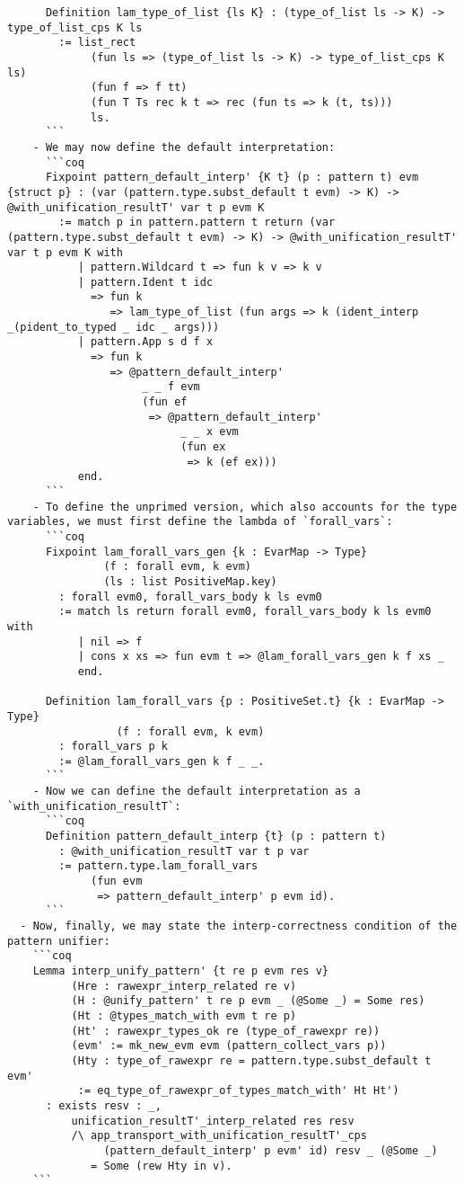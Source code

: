 \begin{itemize}
\begin{verbatim}
      Definition lam_type_of_list {ls K} : (type_of_list ls -> K) -> type_of_list_cps K ls
        := list_rect
             (fun ls => (type_of_list ls -> K) -> type_of_list_cps K ls)
             (fun f => f tt)
             (fun T Ts rec k t => rec (fun ts => k (t, ts)))
             ls.
      ```
    - We may now define the default interpretation:
      ```coq
      Fixpoint pattern_default_interp' {K t} (p : pattern t) evm {struct p} : (var (pattern.type.subst_default t evm) -> K) -> @with_unification_resultT' var t p evm K
        := match p in pattern.pattern t return (var (pattern.type.subst_default t evm) -> K) -> @with_unification_resultT' var t p evm K with
           | pattern.Wildcard t => fun k v => k v
           | pattern.Ident t idc
             => fun k
                => lam_type_of_list (fun args => k (ident_interp _(pident_to_typed _ idc _ args)))
           | pattern.App s d f x
             => fun k
                => @pattern_default_interp'
                     _ _ f evm
                     (fun ef
                      => @pattern_default_interp'
                           _ _ x evm
                           (fun ex
                            => k (ef ex)))
           end.
      ```
    - To define the unprimed version, which also accounts for the type variables, we must first define the lambda of `forall_vars`:
      ```coq
      Fixpoint lam_forall_vars_gen {k : EvarMap -> Type}
               (f : forall evm, k evm)
               (ls : list PositiveMap.key)
        : forall evm0, forall_vars_body k ls evm0
        := match ls return forall evm0, forall_vars_body k ls evm0 with
           | nil => f
           | cons x xs => fun evm t => @lam_forall_vars_gen k f xs _
           end.

      Definition lam_forall_vars {p : PositiveSet.t} {k : EvarMap -> Type}
                 (f : forall evm, k evm)
        : forall_vars p k
        := @lam_forall_vars_gen k f _ _.
      ```
    - Now we can define the default interpretation as a `with_unification_resultT`:
      ```coq
      Definition pattern_default_interp {t} (p : pattern t)
        : @with_unification_resultT var t p var
        := pattern.type.lam_forall_vars
             (fun evm
              => pattern_default_interp' p evm id).
      ```
  - Now, finally, we may state the interp-correctness condition of the pattern unifier:
    ```coq
    Lemma interp_unify_pattern' {t re p evm res v}
          (Hre : rawexpr_interp_related re v)
          (H : @unify_pattern' t re p evm _ (@Some _) = Some res)
          (Ht : @types_match_with evm t re p)
          (Ht' : rawexpr_types_ok re (type_of_rawexpr re))
          (evm' := mk_new_evm evm (pattern_collect_vars p))
          (Hty : type_of_rawexpr re = pattern.type.subst_default t evm'
           := eq_type_of_rawexpr_of_types_match_with' Ht Ht')
      : exists resv : _,
          unification_resultT'_interp_related res resv
          /\ app_transport_with_unification_resultT'_cps
               (pattern_default_interp' p evm' id) resv _ (@Some _)
             = Some (rew Hty in v).
    ```
\end{verbatim}


\end{itemize}
